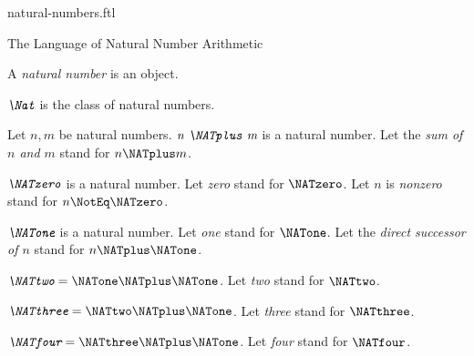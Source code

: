 \documentclass{stex}
\begin{document}
\begin{smodule}{natural-numbers.ftl}

\begin{sfragment}{The Language of Natural Number Arithmetic}
  \begin{signature}[forthel]
    A \emph{natural number} is an object.
  \end{signature}

  \begin{definition}[forthel]
    $\emph{\Nat}$ is the class of natural numbers.
  \end{definition}

  \begin{signature}[forthel]
    Let $n, m$ be natural numbers.
    $\emph{n \NATplus m}$ is a natural number.
    Let the \emph{sum of $n$ and $m$} stand for $n \NATplus m$.
  \end{signature}

  \begin{signature}[forthel]
    $\emph{\NATzero}$ is a natural number.
    Let \emph{zero} stand for $\NATzero$.
    Let $n$ is \emph{nonzero} stand for $n \NotEq \NATzero$.
  \end{signature}

  \begin{signature}[forthel]
    $\emph{\NATone}$ is a natural number.
    Let \emph{one} stand for $\NATone$.
    Let the \emph{direct successor of $n$} stand for $n \NATplus \NATone$.
  \end{signature}

  \begin{definition}[forthel]
    $\emph{\NATtwo} = \NATone \NATplus \NATone$.
    Let \emph{two} stand for $\NATtwo$.
  \end{definition}

  \begin{definition}[forthel]
    $\emph{\NATthree} = \NATtwo \NATplus \NATone$.
    Let \emph{three} stand for $\NATthree$.
  \end{definition}

  \begin{definition}[forthel]
    $\emph{\NATfour} = \NATthree \NATplus \NATone$.
    Let \emph{four} stand for $\NATfour$.
  \end{definition}


\end{sfragment}
\end{smodule}
\end{document}
